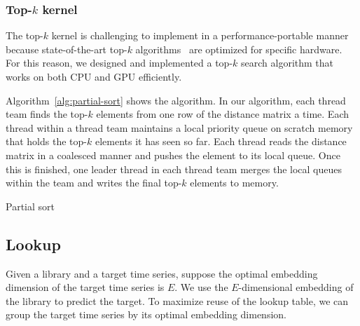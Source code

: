 \documentclass[sigconf]{acmart}
\begin{document}
\subsubsection{Top-$k$ kernel}

The top-$k$ kernel is challenging to implement in a performance-portable manner
because state-of-the-art top-$k$ algorithms~\cite{Johnson2019,Shanbhag2018} are
optimized for specific hardware. For this reason, we designed and implemented a
top-$k$ search algorithm that works on both CPU and GPU efficiently.

Algorithm~\ref{alg:partial-sort} shows the algorithm. In our algorithm, each
thread team finds the top-$k$ elements from one row of the distance matrix a
time. Each thread within a thread team maintains a local priority queue on
scratch memory that holds the top-$k$ elements it has seen so far. Each thread
reads the distance matrix in a coalesced manner and pushes the element to its
local queue. Once this is finished, one leader thread in each thread team merges
the local queues within the team and writes the final top-$k$ elements to
memory.



\begin{algorithm}
    \SetAlgoLined
    \DontPrintSemicolon
    \caption{Partial sort}%
    \label{alg:partial-sort}
\end{algorithm}

\subsection{Lookup}

Given a library and a target time series, suppose the optimal embedding
dimension of the target time series is $E$. We use the $E$-dimensional embedding
of the library to predict the target. To maximize reuse of the lookup table, we
can group the target time series by its optimal embedding dimension.
\end{document}

